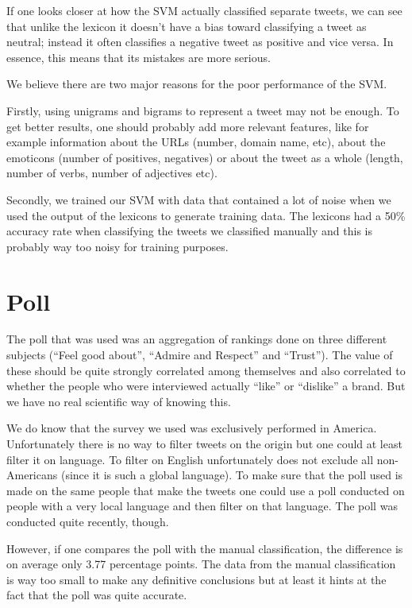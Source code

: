 \documentclass[a4paper,12pt]{report}
\begin{document}
If one looks closer at how the SVM actually classified separate tweets, we can see that unlike the lexicon it doesn't have a bias toward classifying a tweet as neutral; instead it often classifies a negative tweet as positive and vice versa.
In essence, this means that its mistakes are more serious.

We believe there are two major reasons for the poor performance of the SVM.

Firstly, using unigrams and bigrams to represent a tweet may not be enough. To get better results, one should probably add more relevant features, like for example information about the URLs (number, domain name, etc), about the emoticons (number of positives, negatives) or about the tweet as a whole (length, number of verbs, number of adjectives etc).


Secondly, we trained our SVM with data that contained a lot of noise when we used the output of the lexicons to generate training data. The lexicons had a 50\% accuracy rate when classifying the tweets we classified manually and this is probably way too noisy for training purposes.

\section{Poll}

The poll that was used was an aggregation of rankings done on three different subjects (“Feel good about”, “Admire and Respect” and “Trust”). The value of these should be quite strongly correlated among themselves and also correlated to whether the people who were interviewed actually “like” or “dislike” a brand. But we have no real scientific way of knowing this.

We do know that the survey we used was exclusively performed in America. Unfortunately there is no way to filter tweets on the origin but one could at least filter it on language. To filter on English unfortunately does not exclude all non-Americans (since it is such a global language). To make sure that the poll used is made on the same people that make the tweets one could use a poll conducted on people with a very local language and then filter on that language. The poll was conducted quite recently, though.

However, if one compares the poll with the manual classification, the difference is on average only 3.77 percentage points. The data from the manual classification is way too small to make any definitive conclusions but at least it hints at the fact that the poll was quite accurate.
\end{document}
